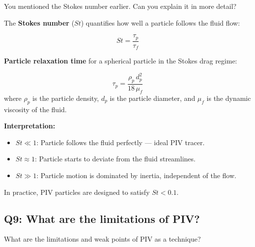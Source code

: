 \documentclass[12pt,a4paper]{article}
\begin{document}
\begin{questionbox}
You mentioned the Stokes number earlier. Can you explain it in more detail?
\end{questionbox}

\begin{answerbox}
The \textbf{\color{accentpurple}Stokes number} ($St$) quantifies how well a particle follows the fluid flow:

\begin{mathbox}
\begin{equation}
    St = \frac{\tau_p}{\tau_f}
\end{equation}
\end{mathbox}

\textbf{Particle relaxation time} for a spherical particle in the Stokes drag regime:
\begin{mathbox}
\begin{equation}
    \tau_p = \frac{\rho_p\, d_p^2}{18\,\mu_f}
\end{equation}
where $\rho_p$ is the particle density, $d_p$ is the particle diameter, and $\mu_f$ is the dynamic viscosity of the fluid.
\end{mathbox}

\vspace{0.5em}
\textbf{\color{deepblue}Interpretation:}
\begin{itemize}[noitemsep, leftmargin=1.5em]
    \item[\color{accentgreen}\faIcon{check-circle}] $St \ll 1$: Particle follows the fluid perfectly --- ideal PIV tracer.
    \item[\color{accentorange}\faIcon{exclamation-circle}] $St \approx 1$: Particle starts to deviate from the fluid streamlines.
    \item[\color{accentred}\faIcon{times-circle}] $St \gg 1$: Particle motion is dominated by inertia, independent of the flow.
\end{itemize}
In practice, PIV particles are designed to satisfy $St < 0.1$.
\end{answerbox}

\subsection{Q9: What are the limitations of PIV?}

\begin{questionbox}
What are the limitations and weak points of PIV as a technique?
\end{questionbox}
\end{document}
